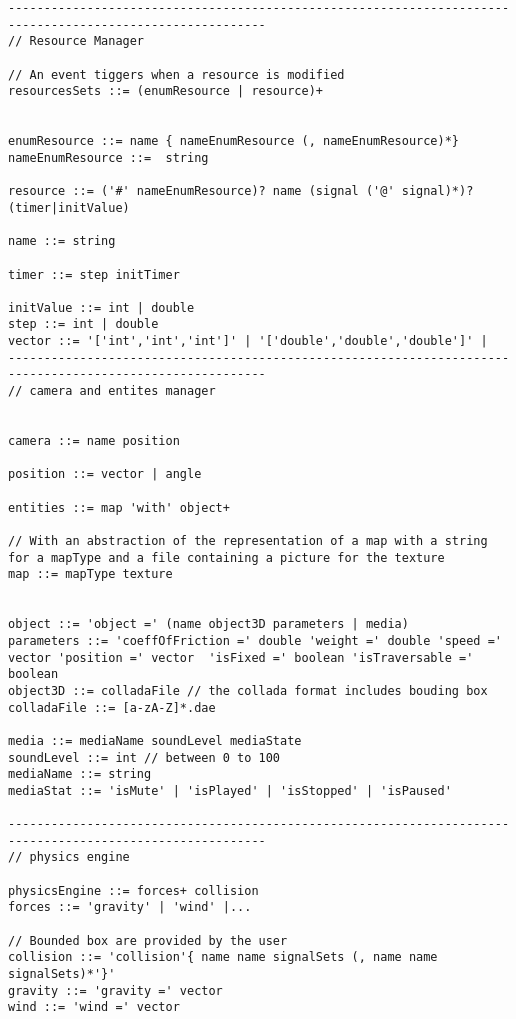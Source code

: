 \begin{lstlisting}[language=Grammar]
----------------------------------------------------------------------------------------------------------
// Resource Manager

// An event tiggers when a resource is modified
resourcesSets ::= (enumResource | resource)+


enumResource ::= name { nameEnumResource (, nameEnumResource)*}
nameEnumResource ::=  string

resource ::= ('#' nameEnumResource)? name (signal ('@' signal)*)? (timer|initValue)

name ::= string

timer ::= step initTimer

initValue ::= int | double
step ::= int | double
vector ::= '['int','int','int']' | '['double','double','double']' |
----------------------------------------------------------------------------------------------------------
// camera and entites manager


camera ::= name position

position ::= vector | angle

entities ::= map 'with' object+

// With an abstraction of the representation of a map with a string for a mapType and a file containing a picture for the texture
map ::= mapType texture


object ::= 'object =' (name object3D parameters | media)
parameters ::= 'coeffOfFriction =' double 'weight =' double 'speed =' vector 'position =' vector  'isFixed =' boolean 'isTraversable =' boolean
object3D ::= colladaFile // the collada format includes bouding box
colladaFile ::= [a-zA-Z]*.dae

media ::= mediaName soundLevel mediaState
soundLevel ::= int // between 0 to 100
mediaName ::= string
mediaStat ::= 'isMute' | 'isPlayed' | 'isStopped' | 'isPaused'

----------------------------------------------------------------------------------------------------------
// physics engine

physicsEngine ::= forces+ collision
forces ::= 'gravity' | 'wind' |...

// Bounded box are provided by the user
collision ::= 'collision'{ name name signalSets (, name name signalSets)*'}'
gravity ::= 'gravity =' vector
wind ::= 'wind =' vector


\end{lstlisting}
